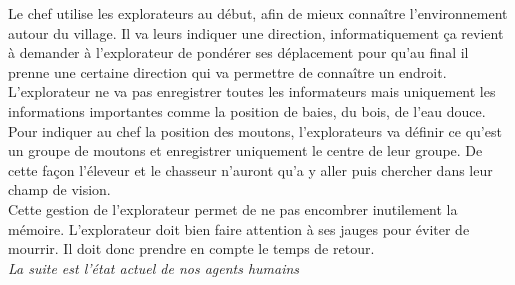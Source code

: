 \documentclass[12pt]{article}
\begin{document}
\begin{itemize}
Le chef utilise les explorateurs au début, afin de mieux connaître 
l'environnement autour du village. Il va leurs indiquer une direction, 
informatiquement ça revient à demander à l'explorateur de pondérer ses 
déplacement pour qu'au final il prenne une certaine direction qui va permettre 
de connaître un endroit.\\

L'explorateur ne va pas enregistrer toutes les informateurs mais uniquement 
les informations importantes comme la position de baies, du bois, de l'eau douce. 
Pour indiquer au chef la position des moutons, l'explorateurs va définir ce 
qu'est un groupe de moutons et enregistrer uniquement le centre de leur 
groupe. De cette façon l'éleveur et le chasseur n'auront qu'a y aller puis 
chercher dans leur champ de vision.\\

Cette gestion de l'explorateur permet de ne pas encombrer inutilement la mémoire. 
L'explorateur doit bien faire attention à ses jauges pour éviter de mourrir. Il 
doit donc prendre en compte le temps de retour.\\

\textit{La suite est l'état actuel de nos agents humains\\}


\end{itemize}
\end{document}
